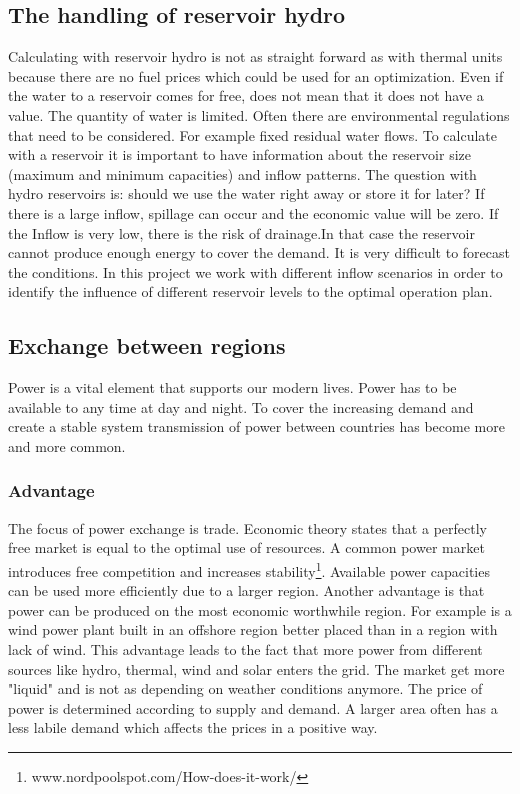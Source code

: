 \documentclass{article}
\begin{document}
\subsection{The handling of reservoir hydro}
Calculating with reservoir hydro is not as straight forward as with thermal units because there are no fuel prices which could be used for an optimization. Even if the water to a reservoir comes for free, does not mean that it does not have a value. The quantity of water is limited. Often there are environmental regulations that need to be considered. For example fixed residual water flows. To calculate with a reservoir it is important to have information about the reservoir size (maximum and minimum capacities) and inflow patterns. The question with hydro reservoirs is: should we use the water right away or store it for later? If there is a large inflow, spillage can occur and the economic value will be zero. If the Inflow is very low, there is the risk of drainage.In that case the reservoir cannot produce enough energy to cover the demand. It is very difficult to forecast the conditions. In this project we work with different inflow scenarios in order to identify the influence of different reservoir levels to the optimal operation plan.
\subsection{Exchange between regions}
Power is a vital element that supports our modern lives. Power has to be available to any time at day and night. To cover the increasing demand and create a stable system transmission of power between countries has become more and more common. 
\subsubsection{Advantage}
The focus of power exchange is trade. Economic theory states that a perfectly free market is equal to the optimal use of resources. A common power market introduces free competition and increases stability\footnote{www.nordpoolspot.com/How-does-it-work/}. Available power capacities can be used more efficiently due to a larger region. Another advantage is that power can be produced on the most economic worthwhile region. For example is a wind power plant built in an offshore region better placed than in a region with lack of wind. This advantage leads to the fact that more power from different sources like hydro, thermal, wind and solar enters the grid. The market get more "liquid" and is not as depending on weather conditions anymore.  The price of power is determined according to supply and demand. A larger area often has a less labile demand which affects the prices in a positive way.
\end{document}
